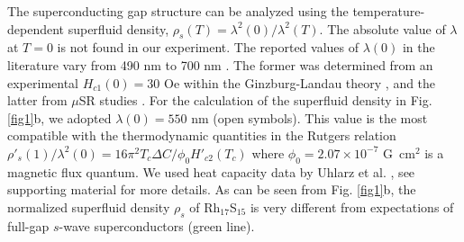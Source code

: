 \documentclass[aps,pra,reprint,superscriptaddress,floatfix]{revtex4-2}
\begin{document}
 
The superconducting gap structure can be analyzed using the temperature-dependent superfluid density, $\rho_s(T) = \lambda^2(0)/\lambda^2(T)$. The absolute value of $\lambda$ at $T=0$ is not found in our experiment. The reported values of $\lambda(0)$ in the literature vary from 490 nm \cite{Settai2010} to 700 nm \cite{Naren2011}. The former was determined from an experimental $H_{c1}(0)=30$ Oe within the Ginzburg-Landau theory \cite{Settai2010}, and the latter from $\mu$SR studies \cite{Naren2011}.  For the calculation of the superfluid density in  Fig. \ref{fig1}b, we adopted $\lambda(0)=550$ nm (open symbols). This value is the most compatible with the thermodynamic quantities in the Rutgers relation  $\rho'_s(1)/\lambda^2(0)=16\pi^2 T_c \Delta C/\phi_0 H'_{c2}(T_c)$ \cite{Kim2013} where $\phi_0=2.07\times 10^{-7}$ G~cm$^{2}$ is a magnetic flux quantum. We used heat capacity data by Uhlarz et al. \cite{Uhlarz2010}, see supporting material for more details. 
As can be seen from Fig. \ref{fig1}b, the normalized superfluid density $\rho_s$ of Rh$_{17}$S$_{15}$ is very different from expectations of full-gap $s$-wave superconductors (green line).
\end{document}
